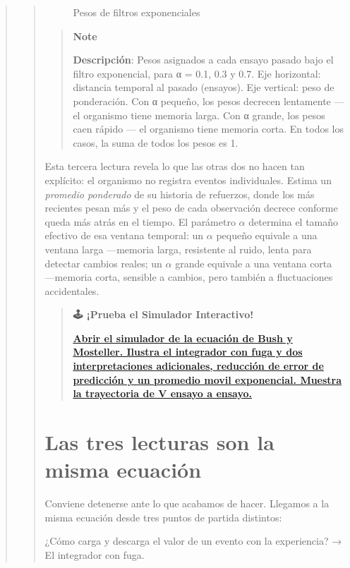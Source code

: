 \documentclass[
  letterpaper,
  DIV=11,
  numbers=noendperiod]{scrreprt}
\begin{document}
\begin{tcolorbox}[enhanced jigsaw, arc=.35mm, bottomrule=.15mm, breakable, colback=white, colframe=quarto-callout-note-color-frame, left=2mm, leftrule=.75mm, opacityback=0, rightrule=.15mm, toprule=.15mm]
\begin{quote}
\begin{quote}
\begin{figure}[H]
{}

\caption{Pesos de filtros exponenciales}

\end{figure}%

\begin{quote}
\textbf{Note}

\textbf{Descripción}: Pesos asignados a cada ensayo pasado bajo el
filtro exponencial, para α = 0.1, 0.3 y 0.7. Eje horizontal: distancia
temporal al pasado (ensayos). Eje vertical: peso de ponderación. Con α
pequeño, los pesos decrecen lentamente --- el organismo tiene memoria
larga. Con α grande, los pesos caen rápido --- el organismo tiene
memoria corta. En todos los casos, la suma de todos los pesos es 1.
\end{quote}

Esta tercera lectura revela lo que las otras dos no hacen tan explícito:
el organismo no registra eventos individuales. Estima un \emph{promedio
ponderado} de su historia de refuerzos, donde los más recientes pesan
más y el peso de cada observación decrece conforme queda más atrás en el
tiempo. El parámetro \(\alpha\) determina el tamaño efectivo de esa
ventana temporal: un \(\alpha\) pequeño equivale a una ventana larga
---memoria larga, resistente al ruido, lenta para detectar cambios
reales; un \(\alpha\) grande equivale a una ventana corta ---memoria
corta, sensible a cambios, pero también a fluctuaciones accidentales.

\begin{quote}
\textbf{🕹️ ¡Prueba el Simulador Interactivo!}

\href{https://colab.research.google.com/github/arbouria/Libro-ACA-2026/blob/main/Simuladores/Bush_Mosteller.ipynb}{\textbf{Abrir
el simulador de la ecuación de Bush y Mosteller. Ilustra el integrador
con fuga y dos interpretaciones adicionales, reducción de error de
predicción y un promedio movil exponencial. Muestra la trayectoria de V
ensayo a ensayo.}}
\end{quote}

\mbox{}%
\section{Las tres lecturas son la misma
ecuación}\label{las-tres-lecturas-son-la-misma-ecuaciuxf3n}

Conviene detenerse ante lo que acabamos de hacer. Llegamos a la misma
ecuación desde tres puntos de partida distintos:

¿Cómo carga y descarga el valor de un evento con la experiencia? → El
integrador con fuga.


\end{quote}
\end{quote}
\end{tcolorbox}
\end{document}
